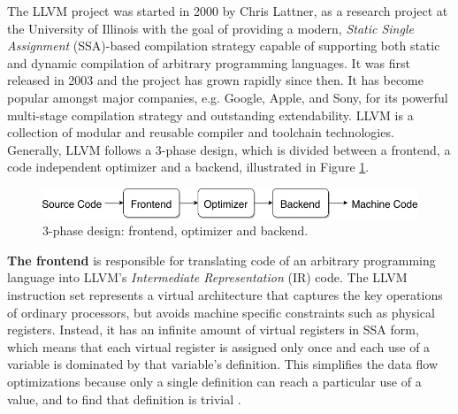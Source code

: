 
The LLVM project was started in 2000 by Chris Lattner, as a research project at the University of Illinois with the goal of providing a modern, \emph{Static Single Assignment} (SSA)-based compilation strategy capable of supporting both static and dynamic compilation of arbitrary programming languages. It was first released in 2003 and the project has grown rapidly since then. It has become popular amongst major companies, e.g. Google, Apple, and Sony, for its powerful multi-stage compilation strategy and outstanding extendability. LLVM is a collection of modular and reusable compiler and toolchain technologies. Generally, LLVM follows a 3-phase design, which is divided between a frontend, a code independent optimizer and a backend, illustrated in Figure \ref{fig:3phase_design}.

\begin{figure}[H]
\centering
\includegraphics[width=.75\textwidth]{figures/3phase_design}%
\caption{3-phase design: frontend, optimizer and backend.}
\label{fig:3phase_design}
\end{figure}

\textbf{The frontend} is responsible for translating code of an arbitrary programming language into LLVM's \emph{Intermediate Representation} (IR) code. The LLVM instruction set represents a virtual architecture that captures the key operations of ordinary processors, but avoids machine specific constraints such as physical registers. Instead, it has an infinite amount of virtual registers in SSA form, which means that each virtual register is assigned only once and each use of a variable is dominated by that variable's definition. This simplifies the data flow optimizations because only a single definition can reach a particular use of a value, and to find that definition is trivial \cite{llvm_strategy}.

%

